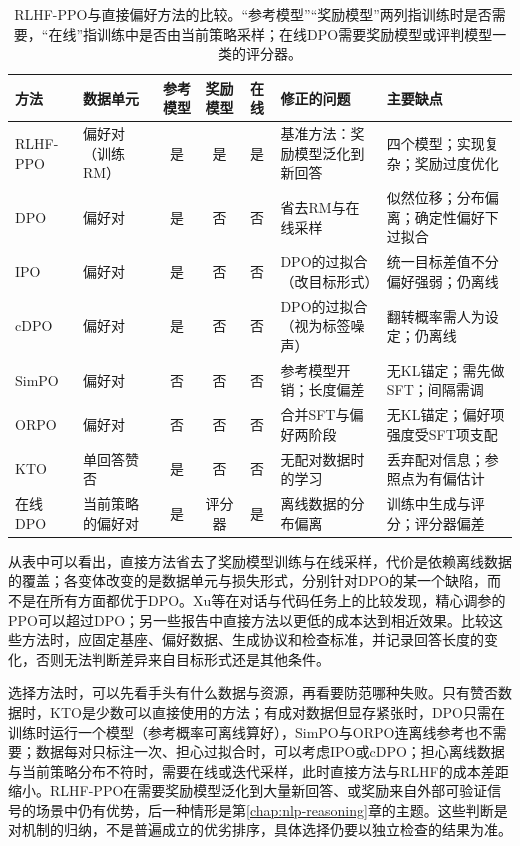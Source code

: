 \begin{table}[htbp]
  \centering
  \small
  \caption{RLHF-PPO与直接偏好方法的比较。“参考模型”“奖励模型”两列指训练时是否需要，“在线”指训练中是否由当前策略采样；在线DPO需要奖励模型或评判模型一类的评分器。}
  \label{tab:nlp-align-methods}
  \begin{tabularx}{\linewidth}{@{}lp{19mm}ccc p{36mm}X@{}}
    \toprule
    方法 & 数据单元 & 参考模型 & 奖励模型 & 在线 & 修正的问题 & 主要缺点\\
    \midrule
    RLHF-PPO & 偏好对（训练RM） & 是 & 是 & 是 & 基准方法：奖励模型泛化到新回答 & 四个模型；实现复杂；奖励过度优化\\
    DPO & 偏好对 & 是 & 否 & 否 & 省去RM与在线采样 & 似然位移；分布偏离；确定性偏好下过拟合\\
    IPO & 偏好对 & 是 & 否 & 否 & DPO的过拟合（改目标形式） & 统一目标差值不分偏好强弱；仍离线\\
    cDPO & 偏好对 & 是 & 否 & 否 & DPO的过拟合（视为标签噪声） & 翻转概率需人为设定；仍离线\\
    SimPO & 偏好对 & 否 & 否 & 否 & 参考模型开销；长度偏差 & 无KL锚定；需先做SFT；间隔需调\\
    ORPO & 偏好对 & 否 & 否 & 否 & 合并SFT与偏好两阶段 & 无KL锚定；偏好项强度受SFT项支配\\
    KTO & 单回答赞否 & 是 & 否 & 否 & 无配对数据时的学习 & 丢弃配对信息；参照点为有偏估计\\
    在线DPO & 当前策略的偏好对 & 是 & 评分器 & 是 & 离线数据的分布偏离 & 训练中生成与评分；评分器偏差\\
    \bottomrule
  \end{tabularx}
\end{table}

从表中可以看出，直接方法省去了奖励模型训练与在线采样，代价是依赖离线数据的覆盖；各变体改变的是数据单元与损失形式，分别针对DPO的某一个缺陷，而不是在所有方面都优于DPO。Xu等在对话与代码任务上的比较发现，精心调参的PPO可以超过DPO\cite{nlp-align-xu2024dpo-ppo}；另一些报告中直接方法以更低的成本达到相近效果。比较这些方法时，应固定基座、偏好数据、生成协议和检查标准，并记录回答长度的变化，否则无法判断差异来自目标形式还是其他条件。

选择方法时，可以先看手头有什么数据与资源，再看要防范哪种失败。只有赞否数据时，KTO是少数可以直接使用的方法；有成对数据但显存紧张时，DPO只需在训练时运行一个模型（参考概率可离线算好），SimPO与ORPO连离线参考也不需要；数据每对只标注一次、担心过拟合时，可以考虑IPO或cDPO；担心离线数据与当前策略分布不符时，需要在线或迭代采样，此时直接方法与RLHF的成本差距缩小。RLHF-PPO在需要奖励模型泛化到大量新回答、或奖励来自外部可验证信号的场景中仍有优势，后一种情形是第\ref{chap:nlp-reasoning}章的主题。这些判断是对机制的归纳，不是普遍成立的优劣排序，具体选择仍要以独立检查的结果为准。

